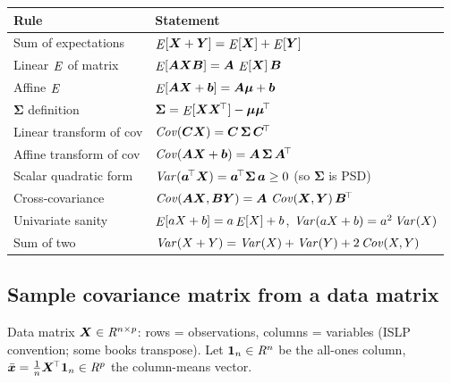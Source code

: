 \begin{center}
\renewcommand{\arraystretch}{1.25}
\begin{tabularx}{\linewidth}{@{}l X@{}}
\toprule
\textbf{Rule} & \textbf{Statement} \\
\midrule
Sum of expectations & $\mathop{\mathit{E}}[\bm{X}+\bm{Y}] = \mathop{\mathit{E}}[\bm{X}] + \mathop{\mathit{E}}[\bm{Y}]$ \\
Linear $\mathop{\mathit{E}}$ of matrix & $\mathop{\mathit{E}}[\bm{A}\bm{X}\bm{B}] = \bm{A}\,\mathop{\mathit{E}}[\bm{X}]\,\bm{B}$ \\
Affine $\mathop{\mathit{E}}$ & $\mathop{\mathit{E}}[\bm{A}\bm{X}+\bm{b}] = \bm{A}\bm{\mu}+\bm{b}$ \\
\addlinespace
$\bm\Sigma$ definition & $\bm\Sigma = \mathop{\mathit{E}}[\bm{X}\bm{X}^{\!\top}] - \bm{\mu}\bm{\mu}^{\!\top}$ \\
\addlinespace
Linear transform of cov &
  $\mathop{\mathit{Cov}}(\bm{C}\bm{X}) = \bm{C}\,\bm\Sigma\,\bm{C}^{\!\top}$
  \quad \\
Affine transform of cov &
  $\mathop{\mathit{Cov}}(\bm{A}\bm{X}+\bm{b}) = \bm{A}\,\bm\Sigma\,\bm{A}^{\!\top}$ \\
Scalar quadratic form &
  $\mathop{\mathit{Var}}(\bm{a}^{\!\top}\bm{X}) = \bm{a}^{\!\top}\bm\Sigma\,\bm{a} \ge 0$
  \;(so $\bm\Sigma$ is PSD) \\
Cross-covariance &
  $\mathop{\mathit{Cov}}(\bm{A}\bm{X},\bm{B}\bm{Y}) = \bm{A}\,\mathop{\mathit{Cov}}(\bm{X},\bm{Y})\,\bm{B}^{\!\top}$ \\
\addlinespace
Univariate sanity & $\mathop{\mathit{E}}[aX+b]=a\mathop{\mathit{E}}[X]+b$,\;
   $\mathop{\mathit{Var}}(aX+b)=a^2\mathop{\mathit{Var}}(X)$ \\
Sum of two & $\mathop{\mathit{Var}}(X+Y)=\mathop{\mathit{Var}}(X)+\mathop{\mathit{Var}}(Y)+2\mathop{\mathit{Cov}}(X,Y)$ \\
\bottomrule
\end{tabularx}
\end{center}

\subsection{Sample covariance matrix from a data matrix}

Data matrix $\bm{X}\in\mathit{R}^{n\times p}$: rows = observations, columns = variables
(ISLP convention; some books transpose).
Let $\bm{1}_n\in\mathit{R}^n$ be the all-ones column,
$\bar{\bm{x}}=\tfrac{1}{n}\bm{X}^{\!\top}\bm{1}_n\in\mathit{R}^p$ the column-means vector.

